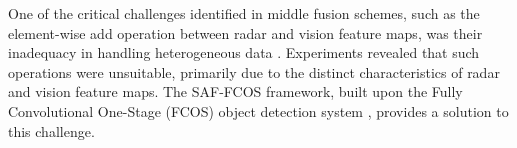 \documentclass[report.tex]{subfiles}
\begin{document}

    One of the critical challenges identified in middle fusion schemes, such as the element-wise add operation between radar and vision feature maps, was their inadequacy in handling heterogeneous data \cite{chadwick2019distant}. Experiments revealed that such operations were unsuitable, primarily due to the distinct characteristics of radar and vision feature maps. The SAF-FCOS framework, built upon the Fully Convolutional One-Stage (FCOS) object detection system \cite{tian2019fcos}, provides a solution to this challenge.
    
    


\end{document}
